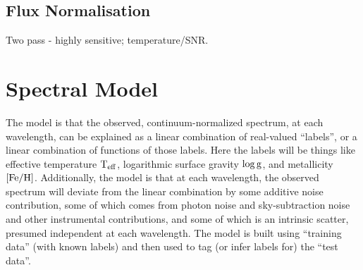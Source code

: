 \documentclass[12pt, preprint]{aastex}
\newcommand{\teff}{\mbox{$\rm T_{eff}$}}
\newcommand{\feh}{\mbox{$\rm [Fe/H]$}}
\newcommand{\logg}{\mbox{$\rm \log g$}}
\begin{document}
\subsection{Flux Normalisation}


Two pass - highly sensitive; temperature/SNR. 



\section{Spectral Model}

The model is that the observed, continuum-normalized spectrum, at each
wavelength, can be explained as a linear combination of real-valued
``labels'', or a linear combination of functions of those labels.
Here the labels will be things like effective temperature $\teff$,
logarithmic surface gravity $\logg$, and metallicity $\feh$.
Additionally, the model is that at each wavelength, the observed
spectrum will deviate from the linear combination by some additive
noise contribution, some of which comes from photon noise and
sky-subtraction noise and other instrumental contributions, and some
of which is an intrinsic scatter, presumed independent at each
wavelength.
The model is built using ``training data'' (with known labels) and then
used to tag (or infer labels for) the ``test data''.
\end{document}
